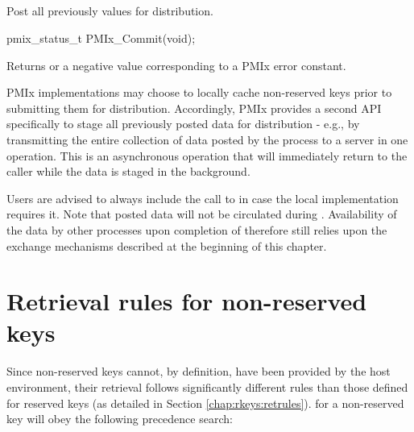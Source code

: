 \subsection{}

\summary

Post all previously  values for distribution.

\format

\cspecificstart
\begin{codepar}
pmix_status_t PMIx_Commit(void);
\end{codepar}
\cspecificend

Returns  or a negative value corresponding to a PMIx error constant.

\descr

\ac{PMIx} implementations may choose to locally cache non-reserved keys prior to submitting them for distribution. Accordingly, \ac{PMIx} provides a second \ac{API} specifically to stage all previously posted data for distribution - e.g., by transmitting the entire collection of data posted by the process to a server in one operation. This is an asynchronous operation that will immediately return to the caller while the data is staged in the background.

\adviceuserstart
Users are advised to always include the call to  in case the local implementation requires it. Note that posted data will not be circulated during . Availability of the data by other processes upon completion of  therefore still relies upon the exchange mechanisms described at the beginning of this chapter.
\adviceuserend


\section{Retrieval rules for non-reserved keys}
\label{chap:nrkeys:retrules}

Since non-reserved keys cannot, by definition, have been provided by the host
environment, their retrieval follows significantly different rules than those
defined for reserved keys (as detailed in Section \ref{chap:rkeys:retrules}).
 for a non-reserved key will obey the
following precedence search:


